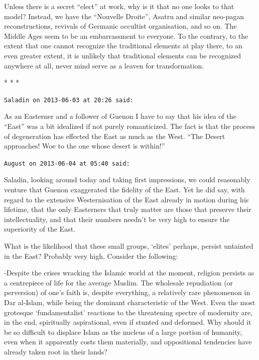 Unless there is a secret ``elect'' at work, why is it that no one looks to that model? Instead, we have the ``Nouvelle Droite'', Asatru and similar neo-pagan reconstructions, revivals of Germanic occultist organisation, and so on. The Middle Ages seem to be an embarrassment to everyone. To the contrary, to the extent that one cannot recognize the traditional elements at play there, to an even greater extent, it is unlikely that traditional elements can be recognized anywhere at all, never mind serve as a leaven for transformation.


\begin{center}* * *\end{center}

\begin{footnotesize}
\begin{sffamily}
\texttt{Saladin on 2013-06-03 at 20:26 said:}

As an Easterner and a follower of Guenon I have to say that his idea of the ``East'' was a bit idealized if not purely romanticized. The fact is that the process of degeneration has effected the East as much as the West. ``The Desert approaches! Woe to the one whose desert is within!''

\hfill

\texttt{August on 2013-06-04 at 05:40 said:}

Saladin, looking around today and taking first impressions, we could reasonably venture that Guenon exaggerated the fidelity of the East. Yet he did say, with regard to the extensive Westernisation of the East already in motion during his lifetime, that the only Easterners that truly matter are those that preserve their intellectuality, and that their numbers needn't be very high to ensure the superiority of the East.

What is the likelihood that these small groups, `elites' perhaps, persist untainted in the East? Probably very high. Consider the following:

-Despite the crises wracking the Islamic world at the moment, religion persists as a centrepiece of life for the average Muslim. The wholesale repudiation (or perversion) of one's faith is, despite everything, a relatively rare phenomenon in Dar al-Islam, while being the dominant characteristic of the West. Even the most grotesque `fundamentalist' reactions to the threatening spectre of modernity are, in the end, spiritually aspirational, even if stunted and deformed. Why should it be so difficult to displace Islam as the nucleus of a large portion of humanity, even when it apparently costs them materially, and oppositional tendencies have already taken root in their lands?


\end{sffamily}
\end{footnotesize}
